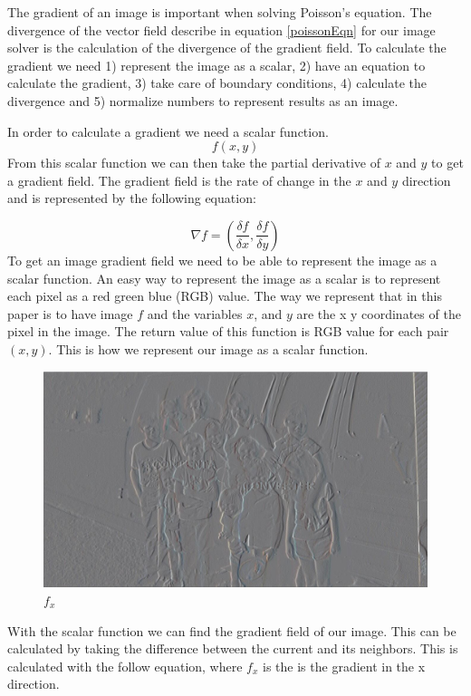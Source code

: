 \documentclass[10pt,twopage]{acmsiggraph}
\begin{document}
The gradient of an image is important when solving Poisson's equation. The divergence of the vector field describe in equation \ref{poissonEqn} for our image solver is the calculation of the divergence of the gradient field. To calculate the gradient we need 1) represent the image as a scalar, 2) have an equation to calculate the gradient, 3) take care of boundary conditions, 4) calculate the divergence and 5) normalize numbers to represent results as an image.

In order to calculate a gradient we need a scalar function.
\begin{equation}
\ensuremath{f(x,y)}
\label{scalar}
\end{equation}
From this scalar function we can then take the partial derivative of $x$ and $y$ to get a gradient field. The gradient field is the rate of change in the $x$ and $y$ direction and is represented by the following equation:

\begin{equation}
\label{gradient}
\ensuremath{\nabla f = ( \frac{\delta f}{\delta x} , \frac{\delta f}{\delta y} )}
\end{equation}
To get an image gradient field we need to be able to represent the image as a scalar function. An easy way to represent the image as a scalar is to represent each pixel as a red green blue (RGB) value. The way we represent that in this paper is to have image $f$ and the variables $x$, and $y$ are the x y coordinates of the pixel in the image. The return value of this function is RGB value for each pair $(x,y)$. This is how we represent our image as a scalar function.

\begin{figure}
\centering
\includegraphics[width=.44\textwidth]{fig/gradientX.jpg}
\caption{\ensuremath{f_{x}}}
\label{ImageX}
\end{figure}


With the scalar function we can find the gradient field of our image. This can be calculated by taking the difference between the current and its neighbors. This is calculated with the follow equation, where \ensuremath{f_{x}} is the is the gradient in the x direction.
\end{document}
